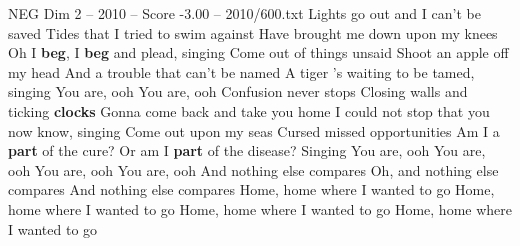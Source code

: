 \begin{textsample}{NEG Dim 2 – 2010 – Score -3.00 – 2010/600.txt}  \label{ex:f2_neg_002}
Lights go out and I can't be saved Tides that I tried to swim against Have brought me down upon my knees Oh I \textbf{beg}, I \textbf{beg} and plead, singing Come out of things unsaid Shoot an apple off my head And a trouble that can't be named A tiger 's waiting to be tamed, singing You are, ooh You are, ooh Confusion never stops Closing walls and ticking \textbf{clocks} Gonna come back and take you home I could not stop that you now know, singing Come out upon my seas Cursed missed opportunities Am I a \textbf{part} of the cure?
Or am I \textbf{part} of the disease?
Singing You are, ooh You are, ooh You are, ooh You are, ooh And nothing else compares Oh, and nothing else compares And nothing else compares Home, home where I wanted to go Home, home where I wanted to go Home, home where I wanted to go Home, home where I wanted to go

\end{textsample}
